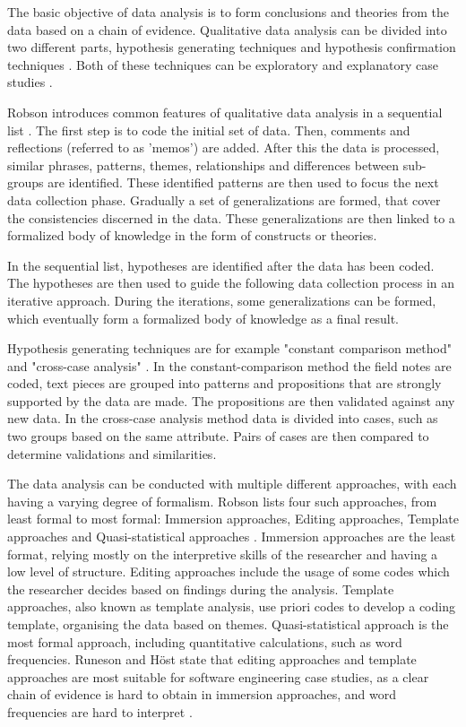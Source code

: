 \documentclass[english]{tktltiki2}
\theoremstyle{definition}
\theoremstyle{remark}
\begin{document}
The basic objective of data analysis is to form conclusions and theories from the data based on a chain of evidence. Qualitative data analysis can be divided into two different parts, hypothesis generating techniques and hypothesis confirmation techniques \cite{runeson2009guidelines}. Both of these techniques can be exploratory and explanatory case studies \cite{runeson2009guidelines}.  

Robson introduces common features of qualitative data analysis in a sequential list \cite{robson2002real}. The first step is to code the initial set of data. Then, comments and reflections (referred to as 'memos') are added. After this the data is processed, similar phrases, patterns, themes, relationships and differences between sub-groups are identified. These identified patterns are then used to focus the next data collection phase. Gradually a set of generalizations are formed, that cover the consistencies discerned in the data. These generalizations are then linked to a formalized body of knowledge in the form of constructs or theories. 

In the sequential list, hypotheses are identified after the data has been coded. The hypotheses are then used to guide the following data collection process in an iterative approach. During the iterations, some generalizations can be formed, which eventually form a formalized body of knowledge as a final result.

Hypothesis generating techniques are for example "constant comparison method" and "cross-case analysis" \cite{seaman1999qualitative}. In the constant-comparison method the field notes are coded, text pieces are grouped into patterns and propositions that are strongly supported by the data are made. The propositions are then validated against any new data. In the cross-case analysis method data is divided into cases, such as two groups based on the same attribute. Pairs of cases are then compared to determine validations and similarities. 

The data analysis can be conducted with multiple different approaches, with each having a varying degree of formalism. Robson lists four such approaches, from least formal to most formal: Immersion approaches, Editing approaches, Template approaches and Quasi-statistical approaches \cite{robson2002real}. Immersion approaches are the least format, relying mostly on the interpretive skills of the researcher and having a low level of structure. Editing approaches include the usage of some codes which the researcher decides based on findings during the analysis. Template approaches, also known as template analysis, use priori codes to develop a coding template, organising the data based on themes. Quasi-statistical approach is the most formal approach, including quantitative calculations, such as word frequencies. Runeson and Höst state that editing approaches and template approaches are most suitable for software engineering case studies, as a clear chain of evidence is hard to obtain in immersion approaches, and word frequencies are hard to interpret \cite{runeson2009guidelines}. 
\end{document}
